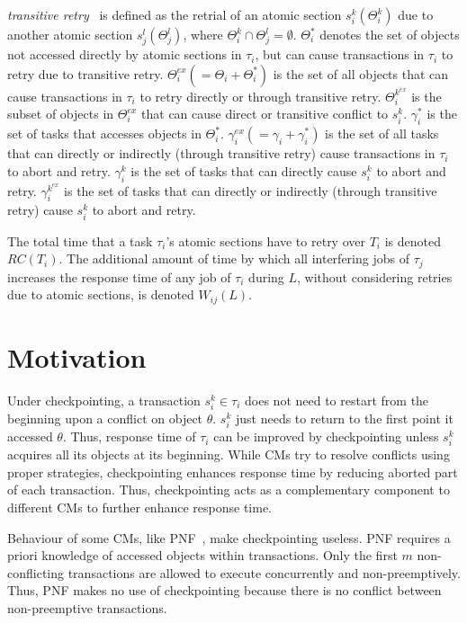 \documentclass[conference]{IEEEtran}
\begin{document}
\textit{transitive retry}~\cite{pnf_dac_asp,fblt} is defined as the retrial of an atomic section $s_i^k(\Theta_i^k)$ due to another atomic section $s_j^l(\Theta_j^l)$, where $\Theta_i^k \cap \Theta_j^l = \emptyset$. $\Theta_i^*$ denotes the set of objects not accessed directly by atomic sections in $\tau_i$, but can cause transactions in $\tau_i$ to retry due to transitive retry. $\Theta_i^{ex}(=\Theta_i + \Theta_i^*)$ is the set of all objects that can cause transactions in $\tau_i$ to retry directly or through transitive retry. $\Theta_i^{k^{ex}}$ is the subset of objects in $\Theta_i^{ex}$ that can cause direct or transitive conflict to $s_i^k$. $\gamma_i^*$ is the set of tasks that accesses  objects in $\Theta_i^*$. $\gamma_i^{ex}(=\gamma_i + \gamma_i^*)$ is the set of all tasks that can directly or indirectly (through transitive retry) cause transactions in $\tau_i$ to abort and retry. $\gamma_i^k$ is the set of tasks that can directly cause $s_i^k$ to abort and retry. $\gamma_i^{k^{ex}}$ is the set of tasks that can directly or indirectly (through transitive retry) cause $s_i^k$ to abort and retry.

The total time that a task $\tau_i$'s atomic sections have to retry over $T_i$ is denoted $RC(T_i)$. The additional amount of time by which all interfering jobs of $\tau_j$ increases the response time of any job of $\tau_i$ during $L$, without considering retries due to atomic sections, is denoted $W_{ij}(L)$.

\section{Motivation}\label{sec:motivation}

Under checkpointing, a transaction $s_i^k \in \tau_i$ does not need to restart from the beginning upon a conflict on object $\theta$. $s_i^k$ just needs to return to the first point it accessed $\theta$. Thus, response time of $\tau_i$ can be improved by checkpointing unless $s_i^k$ acquires all its objects at its beginning. While CMs try to resolve conflicts using proper strategies, checkpointing enhances response time by reducing aborted part of each transaction. Thus, checkpointing acts as a complementary component to different CMs to further enhance response time.

Behaviour of some CMs, like PNF~\cite{pnf_dac_asp}, make checkpointing useless. PNF requires a priori knowledge of accessed objects within transactions. Only the first $m$ non-conflicting transactions are allowed to execute concurrently and non-preemptively. Thus, PNF makes no use of checkpointing because there is no conflict between non-preemptive transactions.
\end{document}
